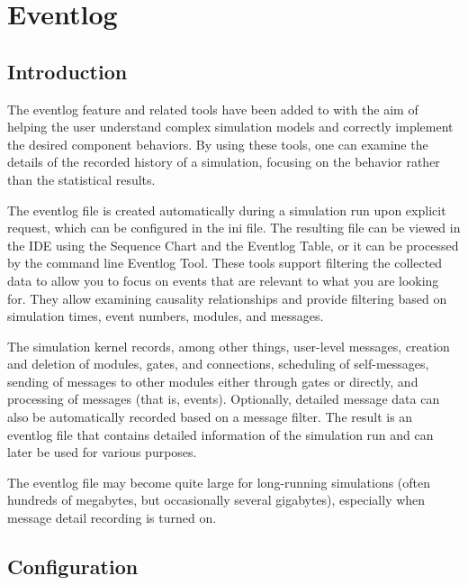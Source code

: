 \chapter{Eventlog}
\label{cha:eventlog}

\section{Introduction}
\label{sec:eventlog:introduction}

The eventlog feature and related tools have been added to {\opp} with the aim of
helping the user understand complex simulation models and correctly implement the
desired component behaviors. By using these tools, one can examine the details of the recorded
history of a simulation, focusing on the behavior rather than the statistical results.

The eventlog file is created automatically during a simulation run upon explicit request,
which can be configured in the ini file. The resulting file can be viewed in the {\opp} IDE using
the Sequence Chart and the Eventlog Table, or it can be processed by the command line Eventlog
Tool. These tools support filtering the collected data to allow you to focus on events
that are relevant to what you are looking for. They allow examining causality relationships and
provide filtering based on simulation times, event numbers, modules, and messages.

The simulation kernel records, among other things, user-level messages,
creation and deletion of modules, gates, and connections, scheduling of self-messages,
sending of messages to other modules either through gates or directly, and processing of
messages (that is, events). Optionally, detailed message data can also be automatically
recorded based on a message filter. The result is an eventlog file that contains detailed
information of the simulation run and can later be used for various purposes.

\begin{note}
    The eventlog file may become quite large for long-running simulations
    (often hundreds of megabytes, but occasionally several gigabytes), especially
    when message detail recording is turned on.
\end{note}

\section{Configuration}
\label{sec:eventlog:configuration}

